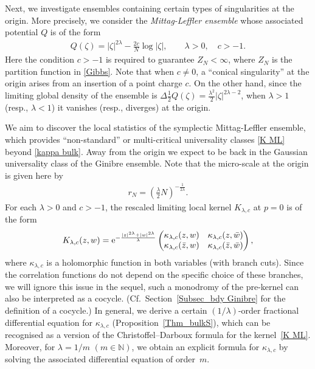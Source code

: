 Next, we investigate ensembles containing certain types of singularities at the origin. More precisely, we consider the \textit{Mittag-Leffler ensemble} whose associated potential $Q$ is of the form
\begin{gather} \label{Q ML}
	Q(\zeta)=|\zeta|^{2\lambda}-\frac{2c}{N} \log|\zeta|, \qquad \lambda>0, \quad c>-1.
\end{gather}
Here the condition $c>-1$ is required to guarantee $Z_N < \infty$, where $Z_N$ is the partition function in \eqref{Gibbs}. Note that when $c \not=0$, a ``conical singularity'' at the origin arises from an insertion of a point charge $c$.
On the other hand, since the limiting global density of the ensemble is $\Delta \tfrac12 Q(\zeta)=\tfrac{\lambda^2}2 |\zeta|^{2\lambda-2}$, when $\lambda>1$ (resp., $\lambda<1$) it vanishes (resp., diverges) at the origin.

We aim to discover the local statistics of the symplectic Mittag-Leffler ensemble, which provides ``non-standard'' or multi-critical universality classes \eqref{K ML} beyond \eqref{kappa bulk}.
Away from the origin we expect to be back in the Gaussian universality class of the Ginibre ensemble.
Note that the micro-scale at the origin is given here by
\begin{gather} \label{micro scale ML}
	r_N=\left(\frac{\lambda}{2}N\right)^{-\frac{1}{2\lambda}}.
\end{gather}
For each $\lambda>0$ and $c>-1$, the rescaled limiting local kernel $K_{\lambda,c}$ at $p=0$ is of the form
\begin{gather} \label{K ML}
	K_{\lambda,c}(z,w)
	={\rm e}^{ -\frac{ |z|^{2\lambda}+|w|^{2\lambda} }{\lambda} } \begin{pmatrix}
		\kappa_{\lambda,c}(z,w) & \kappa_{\lambda,c}(z,\bar{w}) \\
		\kappa_{\lambda,c}(\bar{z},w) & \kappa_{\lambda,c}(\bar{z},\bar{w})
	\end{pmatrix} ,
\end{gather}
where $\kappa_{\lambda,c}$ is a holomorphic function in both variables (with branch cuts).
Since the correlation functions do not depend on the specific choice of these branches, we will ignore this issue in the sequel, such a monodromy of the pre-kernel can also be interpreted as a cocycle. (Cf.\ Section~\ref{Subsec_bdy Ginibre} for the definition of a cocycle.)
In general, we derive a certain $(1/\lambda)$-order fractional differential equation for $\kappa_{\lambda,c}$ (Proposition~\ref{Thm_bulkS}), which can be recognised as a version of the Christoffel--Darboux formula for the kernel~\eqref{K ML}.
Moreover, for $\lambda=1/m$ $(m\in \mathbb{N})$, we obtain an explicit formula for $\kappa_{\lambda,c}$ by solving the associated differential equation of order~$m$.

